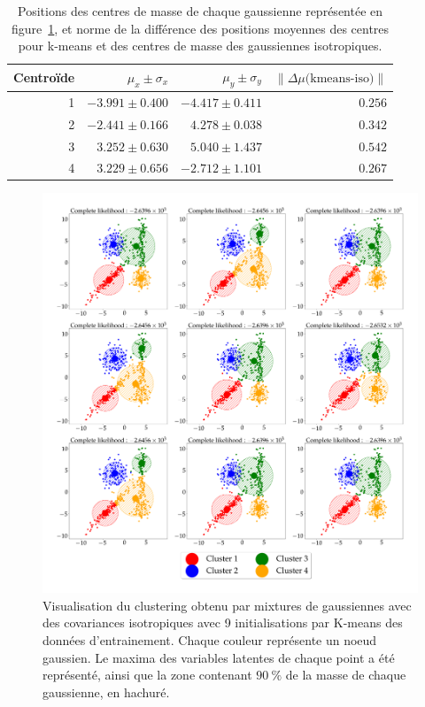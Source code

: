\documentclass[12pt,a4paper,onecolumn]{article}
\begin{document}
\begin{table}[b]
	\centering
	\begin{tabular}{r|r|r|r}
		\hline
		Centroïde & \(\mu_x \pm \sigma_x\) & \(\mu_y \pm \sigma_y\) & \(\lVert\Delta\mu\text{(kmeans-iso)}\rVert\) \\\hline
		1         & \(-3.991\pm 0.400\)    & \(-4.417\pm 0.411\)    & \(0.256\)                                    \\\hline
		2         & \( -2.441 \pm 0.166\)  & \( 4.278\pm 0.038 \)   & \(0.342\)                                    \\\hline
		3         & \( 3.252\pm 0.630\)    & \( 5.040\pm 1.437\)    & \(0.542\)                                    \\\hline
		4         & \( 3.229\pm 0.656\)    & \( -2.712\pm 1.101 \)  & \(0.267\)                                    \\\hline
	\end{tabular}
	\caption{Positions des centres de masse de chaque gaussienne représentée en figure~\ref{fig_4_b}, et norme de la différence des positions moyennes des centres pour k-means et des centres de masse des gaussiennes isotropiques.}
	\label{tab_4_b}
\end{table}

\begin{figure}[H]
	\centering
	\includegraphics[width = \textwidth]{4_b}
	\caption{Visualisation du clustering obtenu par mixtures de gaussiennes avec des covariances isotropiques avec 9 initialisations par K-means des données d'entrainement. Chaque couleur représente un noeud gaussien. Le maxima des variables latentes de chaque point a été représenté, ainsi que la zone contenant \(90~\%\) de la masse de chaque gaussienne, en hachuré.}
	\label{fig_4_b}
\end{figure}
\end{document}
